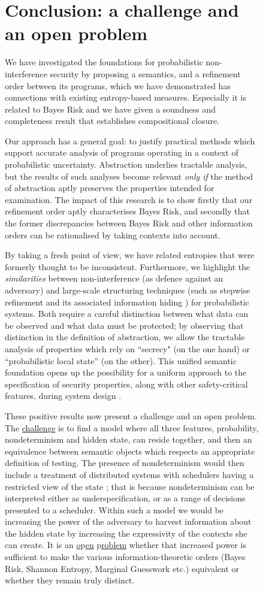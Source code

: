 \documentclass[runningheads]{llncs}
\newenvironment{Figure}[2][t]{\begin{figure}[#1]\def\Label{#2}\small}{\label{\Label}\end{figure}}
\begin{document}
\begin{Figure}[ht!]{f1228}
\section{Conclusion: a challenge and an open problem}\label{s1731}
We have investigated the foundations for probabilistic non-interference security by proposing a semantics, and a refinement order between its programs, which we have demonstrated has connections with existing entropy-based measures. Especially it is related to Bayes Risk and we have given a soundness and completeness result that establishes compositional closure.

Our approach has a  general goal: to justify practical methods which support accurate analysis of programs operating in a context of probabilistic uncertainty. Abstraction underlies tractable analysis, but the results of such analyses become relevant \emph{only if} the method of abstraction aptly preserves the properties intended for examination. The impact of this research is to show firstly that our refinement order aptly characterises Bayes Risk, and secondly that the former discrepancies between Bayes Risk and other information orders can be rationalised by taking contexts into account.

By taking a fresh point of view, we have related entropies that were formerly thought to be inconsistent.
Furthermore, we highlight the \emph{similarities} between non-interference (as defence against an adversary) and large-scale structuring techniques (such as stepwise refinement and its associated information hiding \cite{Parnas:72}) for probabilistic systems. Both require a careful distinction between what data can be observed and what data must be protected; by observing that distinction in the definition of abstraction, we allow the tractable analysis of properties which rely on ``secrecy" (on the one hand) or ``probabilistic local state'' (on the other). This unified semantic foundation opens up the possibility for a uniform approach to the specification of security properties, along with other safety-critical features, during system design \cite{McIver:09f}.

These positive results now present a challenge and an open problem. The \underline{challen}g\underline{e} is to find a model where all three features, probability, nondeterminism and hidden state, can reside together, and then an equivalence between semantic objects which respects an appropriate definition of testing. The presence of nondeterminism would then include a treatment of distributed systems with schedulers having a restricted view of the state \cite{Chatzikokolakis:10}; that is because nondeterminism can be interpreted either as underspecification, or as a range of decisions presented to a scheduler.  Within such a model we would be increasing the power of the adversary  to harvest information about the hidden state by increasing the expressivity of the contexts she can create. It is an \underline{o}p\underline{en} p\underline{roblem} whether that increased power is sufficient to  make the various information-theoretic orders (Bayes Risk, Shannon Entropy, Marginal Guesswork etc.) equivalent or whether they remain truly distinct. 




\end{Figure}
\end{document}
